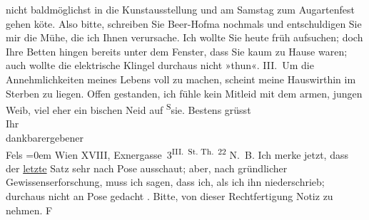 \begin{ledgroupsized}[t]{13cm}
               nicht baldmöglichst in die Kunstausstellung und am Samstag zum Augartenfest gehen kö{\geminationn}te. Also bitte, schreiben Sie Beer-Hofma{\geminationn} nochmals und entschuldigen Sie mir die Mühe, die ich Ihnen verursache. Ich
               wollte Sie heute früh aufsuchen; doch Ihre Betten hingen bereits {\pb}unter dem Fenster, dass Sie kaum zu Hause waren; auch
               wollte die elektrische Klingel durchaus nicht »thun«.\pend
           \pstart
           III. Um die Annehmlichkeiten meines Lebens voll zu machen, scheint meine Hauswirthin im Sterben zu
               liegen. Offen gestanden, ich fühle kein Mitleid mit dem armen, jungen Weib, viel eher
               ein bischen Neid auf \substVorne{}\textsuperscript{S}\substDazwischen{}s\substHinten{}ie.\pend
           \pstart
           Bestens grüsst{\\[\baselineskip]}Ihr{\\[\baselineskip]}dankbarergebener{\\[\baselineskip]}\spacefill\mbox{Fels}\pend
           \leftskip=0em{}\pstart
           \noindent{}Wien XVIII, Exnergasse 3\textsuperscript{III. St. Th. 22}\pend
           \pstart
           N. B. Ich merke jetzt, dass der \uline{letzte} Satz sehr
                  nach Pose ausschaut; aber, nach gründlicher Gewissenserforschung, muss ich sagen,
                  dass ich, als ich ihn niederschrieb; durchaus nicht an Pose gedacht \label{T_L00326-1v}\label{T_L00326-1h}. Bitte, von dieser
                  Rechtfertigung Notiz zu nehmen. \spacefill\mbox{F}\pend
           
         
         \endnumbering{}\end{ledgroupsized}  \newcommand{\dateiname}{L00326}\newcommand{\titel}{Friedrich M. Fels an Arthur Schnitzler, [17. 5. 1894]}\newcommand{\editorInnen}{Martin Anton Müller und Gerd-Hermann Susen}
      